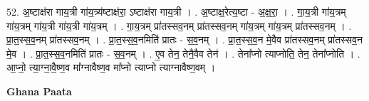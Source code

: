 \documentclass[17pt]{extarticle}
\begin{document}
52. अ॒ष्टाक्ष॑रा गाय॒त्री गा॑य॒त्र्य॑ष्टाक्ष॑रा॒ ऽष्टाक्ष॑रा गाय॒त्री । . अ॒ष्टाक्ष॒रेत्य॒ष्टा - अ॒क्ष॒रा॒ । . गा॒य॒त्री गा॑य॒त्रम् गा॑य॒त्रम् गा॑य॒त्री गा॑य॒त्री गा॑य॒त्रम् । . गा॒य॒त्रम् प्रा॑तस्सव॒नम् प्रा॑तस्सव॒नम् गा॑य॒त्रम् गा॑य॒त्रम् प्रा॑तस्सव॒नम् । . प्रा॒त॒स्स॒व॒नम् प्रा॑तस्सव॒नम् । . प्रा॒त॒स्स॒व॒नमिति॑ प्रातः - स॒व॒नम् । . प्रा॒त॒स्स॒व॒न मे॒वैव प्रा॑तस्सव॒नम् प्रा॑तस्सव॒न मे॒व । . प्रा॒त॒स्स॒व॒नमिति॑ प्रातः - स॒व॒नम् । . ए॒व तेन॒ तेनै॒वैव तेन॑ । . तेना᳚प्नो त्याप्नोति॒ तेन॒ तेना᳚प्नोति । . आ॒प्नो॒ त्या॒ग्ना॒वै॒ष्ण॒व मा᳚ग्नावैष्ण॒व मा᳚प्नो त्याप्नो त्याग्नावैष्ण॒वम् । \newline

\textbf{Ghana Paata } \newline
\end{document}
